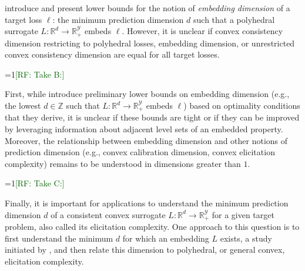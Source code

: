 \documentclass[11pt]{article}
\newcommand{\Comments}{1}
\newcommand{\mynote}[2]{\ifnum\Comments=1\textcolor{#1}{#2}\fi}
\newcommand{\raf}[1]{\mynote{darkgreen}{[RF: #1]}}
\newcommand{\reals}{\mathbb{R}}
\newcommand{\Y}{\mathcal{Y}}
\begin{document}
\citet{finocchiaro2020embedding} introduce and present lower bounds for the notion of \emph{embedding dimension} of a target loss $\ell$: the minimum prediction dimension $d$ such that a polyhedral surrogate $L:\reals^d\to \reals^\Y_+$ embeds $\ell$.
 However, it is unclear if convex consistency dimension restricting to polyhedral losses, embedding dimension, or unrestricted convex consistency dimension are equal for all target losses.


\raf{Take B:}

First, while \citet{finocchiaro2020embedding} introduce preliminary lower bounds on embedding dimension (e.g., the lowest $d \in \mathbb{Z}$ such that $L : \reals^d \to \reals_+^\Y$ embeds $\ell$) based on optimality conditions that they derive, it is unclear if these bounds are tight or if they can be improved by leveraging information about adjacent level sets of an embedded property.
Moreover, the relationship between embedding dimension and other notions of prediction dimension (e.g., convex calibration dimension, convex elicitation complexity) remains to be understood in dimensions greater than $1$.

\raf{Take C:}

Finally, it is important for applications to understand the minimum prediction dimension $d$ of a consistent convex surrogate $L:\reals^d\to \reals^\Y_+$ for a given target problem, also called its elicitation complexity.
One approach to this question is to first understand the minimum $d$ for which an embedding $L$ exists, a study initiated by \citet{finocchiaro2020embedding}, and then relate this dimension to polyhedral, or general convex, elicitation complexity.
\end{document}
